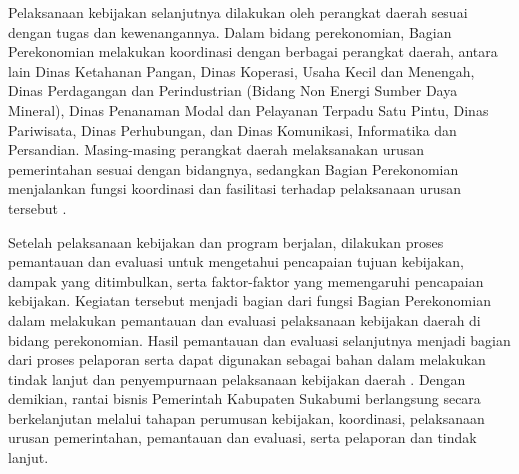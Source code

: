 Pelaksanaan kebijakan selanjutnya dilakukan oleh perangkat daerah sesuai dengan tugas dan kewenangannya. Dalam bidang perekonomian, Bagian Perekonomian melakukan koordinasi dengan berbagai perangkat daerah, antara lain Dinas Ketahanan Pangan, Dinas Koperasi, Usaha Kecil dan Menengah, Dinas Perdagangan dan Perindustrian (Bidang Non Energi Sumber Daya Mineral), Dinas Penanaman Modal dan Pelayanan Terpadu Satu Pintu, Dinas Pariwisata, Dinas Perhubungan, dan Dinas Komunikasi, Informatika dan Persandian. Masing-masing perangkat daerah melaksanakan urusan pemerintahan sesuai dengan bidangnya, sedangkan Bagian Perekonomian menjalankan fungsi koordinasi dan fasilitasi terhadap pelaksanaan urusan tersebut \parencite{perbup1002021}.

Setelah pelaksanaan kebijakan dan program berjalan, dilakukan proses pemantauan dan evaluasi untuk mengetahui pencapaian tujuan kebijakan, dampak yang ditimbulkan, serta faktor-faktor yang memengaruhi pencapaian kebijakan. Kegiatan tersebut menjadi bagian dari fungsi Bagian Perekonomian dalam melakukan pemantauan dan evaluasi pelaksanaan kebijakan daerah di bidang perekonomian. Hasil pemantauan dan evaluasi selanjutnya menjadi bagian dari proses pelaporan serta dapat digunakan sebagai bahan dalam melakukan tindak lanjut dan penyempurnaan pelaksanaan kebijakan daerah \parencite{perbup1002021}. Dengan demikian, rantai bisnis Pemerintah Kabupaten Sukabumi berlangsung secara berkelanjutan melalui tahapan perumusan kebijakan, koordinasi, pelaksanaan urusan pemerintahan, pemantauan dan evaluasi, serta pelaporan dan tindak lanjut.






